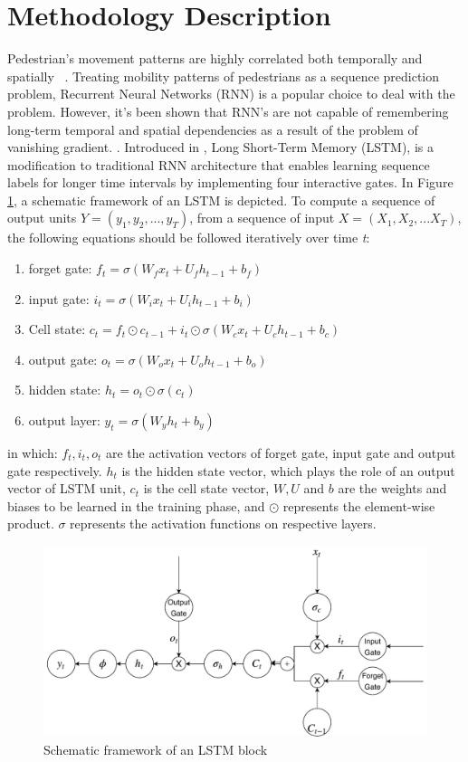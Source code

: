 \section{Methodology Description}
\label{S:T4}
Pedestrian's movement patterns are highly correlated both temporally and spatially ~\citep{song2016deeptransport}. Treating mobility patterns of pedestrians as a sequence prediction problem, Recurrent Neural Networks (RNN) is a popular choice to deal with the problem.  However, it's been shown that RNN's are not capable of remembering long-term temporal and spatial dependencies as a result of the problem of vanishing gradient. \citep{hochreiter1997long}. Introduced in \citep{hochreiter1997long}, Long Short-Term Memory (LSTM), is a modification to traditional RNN architecture that enables learning sequence labels for longer time intervals by implementing four interactive gates. In Figure \ref{fig:LSTM}, a schematic framework of an LSTM is depicted. To compute a sequence of output units \(Y=(y_1,y_2,...,y_T)\), from a sequence of input \(X=(X_1,X_2,...X_T)\), the following equations should be followed iteratively over time \textit{t}:
\begin{enumerate}
    \item forget gate: \(f_t=\sigma(W_fx_t+U_fh_{t-1}+b_f)\)
    \item input gate: \(i_t=\sigma(W_ix_t+U_ih_{t-1}+b_i)\)
    \item Cell state: \(c_t=f_t\odot c_{t-1}+i_t\odot \sigma(W_cx_t+U_ch_{t-1}+b_c) \)
    \item output gate: \(o_t=\sigma(W_ox_t+U_oh_{t-1}+b_o)\)
    \item hidden state: \(h_t=o_t\odot \sigma(c_t)\)
    \item output layer: \(y_t=\sigma(W_{y}h_t+b_y)\)
\end{enumerate}
in which: \(f_t,i_t,o_t\) are the activation vectors of forget gate, input gate and output gate respectively. \(h_t\) is the hidden state vector, which plays the role of an output vector of LSTM unit, \(c_t\) is the cell state vector, \(W,U\) and \(b\) are the weights and biases to be learned in the training phase, and \(\odot\) represents the element-wise product. \(\sigma\) represents the activation functions on respective layers. 
\begin{figure}[!h]
    \centering
    \includegraphics[scale=0.6]{chapter_6/figures/lstm.pdf}
    \caption{Schematic framework of an LSTM block}
    \label{fig:LSTM}
\end{figure}


